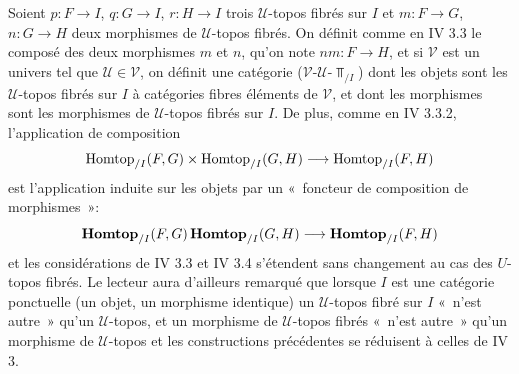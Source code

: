 \documentclass[10pt]{../fichiers-configuration-latex/smfart}
\begin{document}
\subsubsection{}

Soient $p : F \to I$, $q : G \to I$, $r : H \to I$ trois $𝒰$-topos
fibrés sur $I$ et $m : F \to G$, $n : G \to H$ deux morphismes de
$𝒰$-topos fibrés. On définit comme en IV 3.3 le composé des deux
morphismes $m$ et $n$, qu'on note $nm : F \to H$, et si $𝒱$ est un
univers tel que $𝒰 \in 𝒱$,
on définit une catégorie ($𝒱$-$𝒰$-$\Top_{/I}$)
dont les objets sont les $𝒰$-topos fibrés sur $I$ à catégories fibres
éléments de $𝒱$, et dont les morphismes sont les morphismes de
$𝒰$-topos fibrés sur $I$. De plus, comme en IV 3.3.2, l'application de
composition
$$
\Homtop_{/I} (F, G) \times \Homtop_{/I} (G, H) \to \Homtop_{/I} (F, H)
$$
est l'application induite sur les objets par un « foncteur de
composition de morphismes »:
$$
\Hhomtop_{/I} (F, G) \Hhomtop_{/I} (G, H) \to \Hhomtop_{/I} (F, H)
$$
et les considérations de IV 3.3 et IV 3.4 s'étendent sans changement
au cas des $U$-topos fibrés. Le lecteur aura d'ailleurs remarqué que
lorsque $I$ est une catégorie ponctuelle (un objet, un morphisme
identique) un $𝒰$-topos fibré sur $I$ « n'est autre » qu'un
$𝒰$-topos, et un morphisme de $𝒰$-topos fibrés
« n'est autre » qu'un morphisme de $𝒰$-topos et les constructions
précédentes se réduisent à celles de IV 3.

\subsubsection{}
\end{document}
